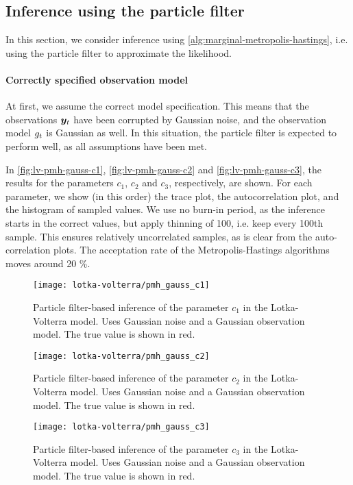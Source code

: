 \subsection{Inference using the particle filter}
In this section, we consider inference using \autoref{alg:marginal-metropolis-hastings}, i.e. using the particle filter to approximate the likelihood.

\paragraph{Correctly specified observation model}
At first, we assume the correct model specification. This means that the observations $\bm{y}_t$ have been corrupted by Gaussian noise, and the observation model $g_t$ is Gaussian as well. In this situation, the particle filter is expected to perform well, as all assumptions have been met.

In \autoref{fig:lv-pmh-gauss-c1}, \autoref{fig:lv-pmh-gauss-c2} and \autoref{fig:lv-pmh-gauss-c3}, the results for the parameters $c_1$, $c_2$ and $c_3$, respectively, are shown. For each parameter, we show (in this order) the trace plot, the autocorrelation plot, and the histogram of sampled values. We use no burn-in period, as the inference starts in the correct values, but apply thinning of 100, i.e. keep every 100th sample. This ensures relatively uncorrelated samples, as is clear from the auto-correlation plots. The acceptation rate of the Metropolis-Hastings algorithms moves around 20 \%.

\begin{figure}[ht]
    \centering
    \texttt{[image: lotka-volterra/pmh\_gauss\_c1]}
    \caption{Particle filter-based inference of the parameter $c_1$ in the Lotka-Volterra model. Uses Gaussian noise and a Gaussian observation model. The true value is shown in red.}
    \label{fig:lv-pmh-gauss-c1}
\end{figure}

\begin{figure}[ht]
    \centering
    \texttt{[image: lotka-volterra/pmh\_gauss\_c2]}
    \caption{Particle filter-based inference of the parameter $c_2$ in the Lotka-Volterra model. Uses Gaussian noise and a Gaussian observation model. The true value is shown in red.}
    \label{fig:lv-pmh-gauss-c2}
\end{figure}

\begin{figure}[ht]
    \centering
    \texttt{[image: lotka-volterra/pmh\_gauss\_c3]}
    \caption{Particle filter-based inference of the parameter $c_3$ in the Lotka-Volterra model. Uses Gaussian noise and a Gaussian observation model. The true value is shown in red.}
    \label{fig:lv-pmh-gauss-c3}
\end{figure}


